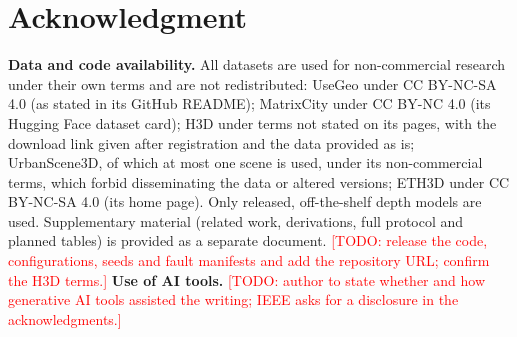 \documentclass[letterpaper,journal,twoside]{IEEEtran}
\begin{document}
\IEEEpeerreviewmaketitle







\label{endmaintext}

\section*{Acknowledgment}
\textbf{Data and code availability.} All datasets are used for non-commercial research under their own
terms and are not redistributed: UseGeo under CC BY-NC-SA 4.0 (as stated in its GitHub README);
MatrixCity under CC BY-NC 4.0 (its Hugging Face dataset card); H3D under terms not stated on its pages,
with the download link given after registration and the data provided as is; UrbanScene3D, of which at
most one scene is used, under its non-commercial terms, which forbid disseminating the data or altered
versions; ETH3D under CC BY-NC-SA 4.0 (its home page). Only released, off-the-shelf depth models are used.
Supplementary material (related work, derivations, full protocol and planned tables) is provided as a
separate document.
\textcolor{red}{[TODO: release the code, configurations, seeds and fault manifests and add the repository URL; confirm the H3D terms.]}
\textbf{Use of AI tools.} \textcolor{red}{[TODO: author to state whether and how generative AI tools assisted the writing; IEEE asks for a disclosure in the acknowledgments.]}



\end{document}
